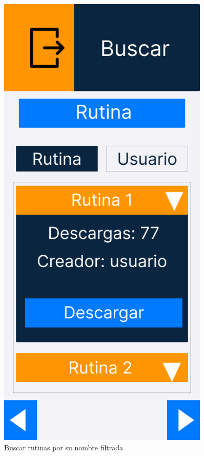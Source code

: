 \begin{figure}[H]
\begin{minipage}{0.45\textwidth}
      \includegraphics[width=0.9\textwidth]{fotos/Frame 59.png}
      \caption{Buscar rutinas por su nombre filtrada}
      \label{fig:Buscar rutinas por su nombre filtrada}
   \end{minipage}
\end{figure}


